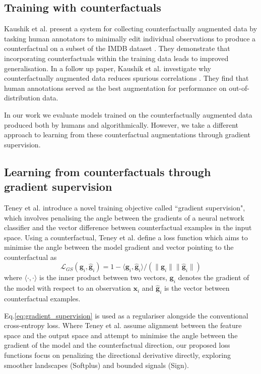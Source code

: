 \documentclass[sigconf,anonymous]{aamas}
\begin{document}
\subsection{Training with counterfactuals}
Kaushik et al. \cite{Kaushik2020Learning} present a system for collecting counterfactually augmented data by tasking human annotators to minimally edit individual observations to produce a counterfactual on a subset of the IMDB dataset \cite{imdb}. They demonstrate that incorporating counterfactuals within the training data leads to improved generalisation. In a follow up paper, Kaushik et al. investigate why counterfactually augmented data reduces spurious correlations \cite{kaushik2021explaining}. They find that human annotations served as the best augmentation for performance on out-of-distribution data. 

In our work we evaluate models trained on the counterfactually augmented data produced both by humans and algorithmically. However, we take a different approach to learning from these counterfactual augmentations through gradient supervision.

\subsection{Learning from counterfactuals through gradient supervision}
\label{subsec:gradient_supervision}
Teney et al. \cite{teney2020learning} introduce a novel training objective called ``gradient supervision", which involves penalising the angle between the gradients of a neural network classifier and the vector difference between counterfactual examples in the input space. Using a counterfactual, Teney et al. define a loss function which aims to minimise the angle between the model gradient and vector pointing to the counterfactual as 
\begin{equation}
        \mathcal{L}_{GS} \left(\mathbf{g}_i,\hat{\mathbf{g}}_i \right)  = 
        1 - \langle\mathbf{g}_i,\hat{\mathbf{g}}_i \rangle /
        \left( \lVert \mathbf{g}_i \rVert \lVert \hat{\mathbf{g}}_i \rVert \right)
        \label{eq:gradient_supervision}
\end{equation}
where $\langle \cdot, \cdot \rangle$ is the inner product between two vectors, $\mathbf{g}_i$ denotes the gradient of the model with respect to an observation $\mathbf{x}_i$ and $\hat{\mathbf{g}}_i$ is the vector between counterfactual examples. 

Eq.\ref{eq:gradient_supervision} is used as a regulariser alongside the conventional cross-entropy loss. Where Teney et al. assume alignment between the feature space and the output space and attempt to minimise the angle between the gradient of the model and the counterfactual direction, our proposed loss functions focus on penalizing the directional derivative directly, exploring smoother landscapes (Softplus) and bounded signals (Sign).
\end{document}
